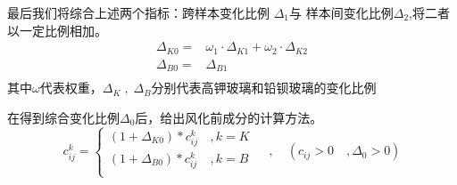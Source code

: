 \documentclass{my_paper}
\begin{document}
\begin{enumerate}
    最后我们将综合上述两个指标：跨样本变化比例 $ \Delta_1 $与 样本间变化比例$ \Delta_2 $,将二者以一定比例相加。
    \begin{equation}
        \begin{aligned}
            \Delta_{K0} =& \omega_1 \cdot \Delta_{K1} +\omega_2 \cdot \Delta_{K2} \\            
            \Delta_{B0} =& \Delta_{B1} \\            
        \end{aligned}
    \label{d0}
    \end{equation}
    其中$ \omega $代表权重，$ \Delta_{K}\;,\;\Delta_{B} $分别代表高钾玻璃和铅钡玻璃的变化比例

    在得到综合变化比例$ \Delta_0 $后，给出风化前成分的计算方法。
    \begin{equation}
    c_{ij}^k = \begin{cases}
        (1+\Delta_{K0})*c_{ij}^k&\,,k=K\\
        (1+\Delta_{B0})*c_{ij}^k&\,,k=B\\
    \end{cases} \, \quad , \quad (c_{ij}>0\quad ,\Delta_0 > 0)
    \label{cijk}
    \end{equation}

\end{enumerate}
\end{document}
